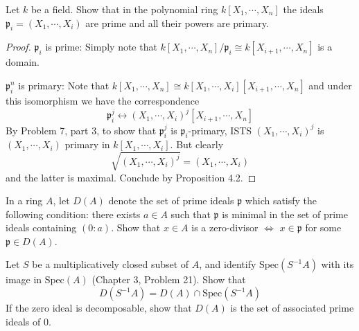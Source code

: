 \documentclass{solution}
\begin{document}
\begin{problem}
    Let $k$ be a field. Show that in the polynomial ring $k[X_1, \cdots, X_n]$ the ideals $\mathfrak{p}_i = (X_1, \cdots, X_i)$  are prime and all their powers are primary.
\end{problem}

\begin{proof}
    $\mathfrak{p}_i$ is prime: Simply note that $k[X_1, \cdots, X_n] / \mathfrak{p}_i \cong k[X_{i + 1}, \cdots, X_n]$ is a domain.

    $\mathfrak{p}_i^n$ is primary: Note that $k[X_1, \cdots, X_n] \cong k[X_1, \cdots, X_i][X_{i + 1}, \cdots, X_{n}]$ and under this isomorphism we have the correspondence
    $$\mathfrak{p}_i^j \leftrightarrow (X_1, \cdots, X_i)^j[X_{i + 1}, \cdots, X_n]$$
    By Problem 7, part 3, to show that $\mathfrak{p}_i^j$ is $\mathfrak{p}_i$-primary, ISTS $(X_1, \cdots, X_i)^j$ is $(X_1, \cdots, X_i)$ primary in $k[X_1, \cdots, X_i]$. But clearly
    $$\sqrt{(X_1, \cdots, X_i)^j} = (X_1, \cdots, X_i)$$
    and the latter is maximal. Conclude by Proposition 4.2.
\end{proof}

\begin{problem}
    In a ring $A$, let $D(A)$ denote the set of prime ideals $\mathfrak{p}$ which satisfy the following condition: there exists $a \in A$ such that $\mathfrak{p}$ is minimal in the set of prime ideals containing $(0: a)$. Show that $x \in A$ is a zero-divisor $\Leftrightarrow$ $x \in \mathfrak{p}$ for some $\mathfrak{p} \in D(A)$.

    Let $S$ be a multiplicatively closed subset of $A$, and identify $\mathrm{Spec}(S ^{-1}A)$ with its image in $\mathrm{Spec}(A)$ (Chapter 3, Problem 21). Show that
    $$D(S ^{-1}A) = D(A) \cap \mathrm{Spec}(S ^{-1} A)$$
    If the zero ideal is decomposable, show that $D(A)$ is the set of associated prime ideals of $0$.
\end{problem}
\end{document}
